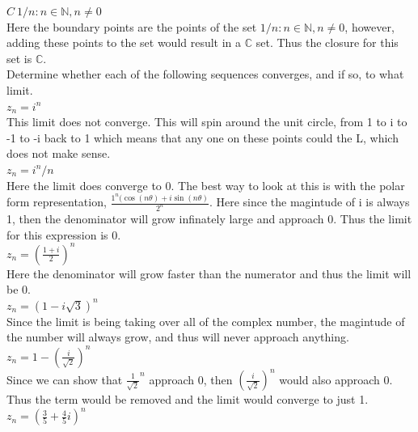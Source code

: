 \documentclass[12pt]{article}
\begin{document}
 $C \ {1/n: n \in \mathbb{N}, n \neq 0}$\\

Here the boundary points are the points of the set ${1/n: n \in \mathbb{N}, n \neq 0}$, however, adding these points to the set would result in a $\mathbb{C}$ set.
Thus the closure for this set is $\mathbb{C}$.\\


 Determine whether each of the following sequences converges, and if so, to what limit.\\

 $z_n = i^n$ \\

This limit does not converge.
This will spin around the unit circle, from 1 to i to -1 to -i back to 1 which means that any one on these points could the L, which does not make sense.\\

 $z_n = i^n/n$ \\

Here the limit does converge to 0.
The best way to look at this is with the polar form representation, $ \frac{1^n(\cos(n\theta) + i\sin(n\theta)}{2^n}$.
Here since the magintude of i is always 1, then the denominator will grow infinately large and approach 0.
Thus the limit for this expression is 0.\\

 $z_n = (\frac{1+i}{2})^n$ \\

Here the denominator will grow faster than the numerator and thus the limit will be 0.\\

 $z_n = (1 - i\sqrt{3})^n$\\

Since the limit is being taking over all of the complex number, the magintude of the number will always grow, and thus will never approach anything.\\

 $z_n = 1 - (\frac{i}{\sqrt{2}})^n$\\

Since we can show that $\frac{1}{\sqrt{2}}^n$ approach 0, then $(\frac{i}{\sqrt{2}})^n$ would also approach 0.
Thus the term would be removed and the limit would converge to just 1.\\

 $z_n = (\frac{3}{5} + \frac{4}{5}i)^n$\\
\end{document}

